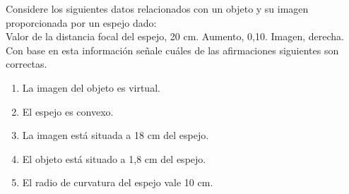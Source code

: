 
Considere los siguientes datos relacionados con un objeto y su imagen proporcionada por un espejo dado:\\
Valor de la distancia focal del espejo, 20 cm. Aumento, 0,10.
Imagen, derecha.\\
Con base en esta información señale cuáles de las afirmaciones siguientes son correctas.
\begin{enumerate}
    \item La imagen del objeto es virtual.
    \item El espejo es convexo.
    \item La imagen está situada a 18 cm del espejo.
    \item El objeto está situado a 1,8 cm del espejo.
    \item El radio de curvatura del espejo vale 10 cm.
\end{enumerate}